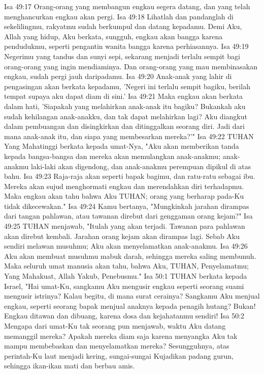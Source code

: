 Isa 49:17  Orang-orang yang membangun engkau segera datang, dan yang telah menghancurkan engkau akan pergi.
Isa 49:18  Lihatlah dan pandanglah di sekelilingmu, rakyatmu sudah berkumpul dan datang kepadamu. Demi Aku, Allah yang hidup, Aku berkata, sungguh, engkau akan bangga karena pendudukmu, seperti pengantin wanita bangga karena perhiasannya.
Isa 49:19  Negerimu yang tandus dan sunyi sepi, sekarang menjadi terlalu sempit bagi orang-orang yang ingin mendiaminya. Dan orang-orang yang mau membinasakan engkau, sudah pergi jauh daripadamu.
Isa 49:20  Anak-anak yang lahir di pengasingan akan berkata kepadamu, 'Negeri ini terlalu sempit bagiku, berilah tempat supaya aku dapat diam di sini.'
Isa 49:21  Maka engkau akan berkata dalam hati, 'Siapakah yang melahirkan anak-anak itu bagiku? Bukankah aku sudah kehilangan anak-anakku, dan tak dapat melahirkan lagi? Aku diangkut dalam pembuangan dan disingkirkan dan ditinggalkan seorang diri. Jadi dari mana anak-anak itu, dan siapa yang membesarkan mereka?'"
Isa 49:22  TUHAN Yang Mahatinggi berkata kepada umat-Nya, "Aku akan memberikan tanda kepada bangsa-bangsa dan mereka akan memulangkan anak-anakmu; anak-anakmu laki-laki akan digendong, dan anak-anakmu perempuan dipikul di atas bahu.
Isa 49:23  Raja-raja akan seperti bapak bagimu, dan ratu-ratu sebagai ibu. Mereka akan sujud menghormati engkau dan merendahkan diri terhadapmu. Maka engkau akan tahu bahwa Aku TUHAN; orang yang berharap pada-Ku tidak dikecewakan."
Isa 49:24  Kamu bertanya, "Mungkinkah jarahan dirampas dari tangan pahlawan, atau tawanan direbut dari genggaman orang kejam?"
Isa 49:25  TUHAN menjawab, "Itulah yang akan terjadi. Tawanan para pahlawan akan direbut kembali. Jarahan orang kejam akan dirampas lagi. Sebab Aku sendiri melawan musuhmu; Aku akan menyelamatkan anak-anakmu.
Isa 49:26  Aku akan membuat musuhmu mabuk darah, sehingga mereka saling membunuh. Maka seluruh umat manusia akan tahu, bahwa Aku, TUHAN, Penyelamatmu; Yang Mahakuat, Allah Yakub, Penebusmu."
Isa 50:1  TUHAN berkata kepada Israel, "Hai umat-Ku, sangkamu Aku mengusir engkau seperti seorang suami mengusir istrinya? Kalau begitu, di mana surat cerainya? Sangkamu Aku menjual engkau, seperti seorang bapak menjual anaknya kepada penagih hutang? Bukan! Engkau ditawan dan dibuang, karena dosa dan kejahatanmu sendiri!
Isa 50:2  Mengapa dari umat-Ku tak seorang pun menjawab, waktu Aku datang memanggil mereka? Apakah mereka diam saja karena menyangka Aku tak mampu membebaskan dan menyelamatkan mereka? Sesungguhnya, atas perintah-Ku laut menjadi kering, sungai-sungai Kujadikan padang gurun, sehingga ikan-ikan mati dan berbau amis.
